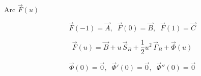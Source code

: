 \documentclass[aps,12pt]{revtex4}
\begin{document}
Arc $\vec{F}(u)$

\begin{equation}
	\vec{F}(-1) = \vec{A},\;\; \vec{F}(0) = \vec{B}, \;\; \vec{F}(1) = \vec{C}
\end{equation}

\begin{equation}
	\vec{F}(u) = \vec{B} + u\,\vec{S}_B + \frac{1}{2}u^2 \, \vec{\Gamma}_B + \vec{\Phi}(u)
\end{equation}

\begin{equation}
	\vec{\Phi}(0) = \vec{0}, \;\; \vec{\Phi}'(0) = \vec{0},\;\; \vec{\Phi}''(0) = \vec{0}
\end{equation}
\end{document}
